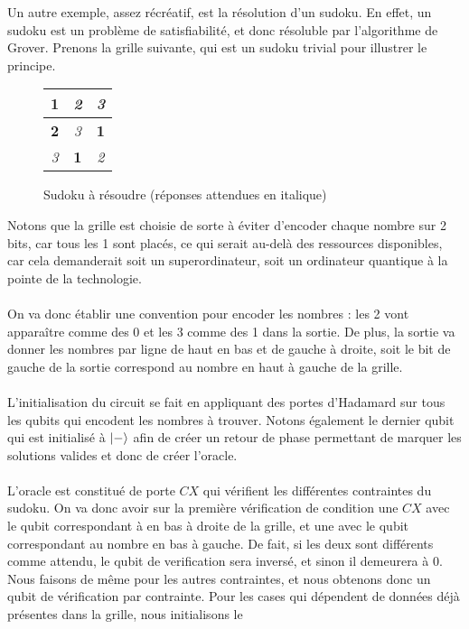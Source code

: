 Un autre exemple, assez récréatif, est la résolution d'un sudoku.
En effet, un sudoku est un problème de satisfiabilité, et donc résoluble par l'algorithme
de Grover.
Prenons la grille suivante, qui est un sudoku trivial pour illustrer le principe.
\begin{figure}[H]
    \centering
    \begin{tabular}{|c|c|c|}
        \hline
        \textbf{1} & \textit{2} & \textit{3} \\
        \hline
        \textbf{2} & \textit{3} & \textbf{1} \\
        \hline
        \textit{3} & \textbf{1} & \textit{2} \\
        \hline
    \end{tabular}
    \caption{Sudoku à résoudre (réponses attendues en italique)}
    \label{fig:sudoku}
\end{figure}
Notons que la grille est choisie de sorte à éviter d'encoder chaque nombre sur 2 bits,
car tous les 1 sont placés, ce qui serait au-delà des ressources disponibles, car cela
demanderait soit un superordinateur, soit un ordinateur quantique à la pointe de la technologie.\\ \\
On va donc établir une convention pour encoder les nombres : les 2 vont apparaître comme des
0 et les 3 comme des 1 dans la sortie.
De plus, la sortie va donner les nombres par ligne de haut en bas et de gauche à droite, soit
le bit de gauche de la sortie correspond au nombre en haut à gauche de la grille.\\ \\
L'initialisation du circuit se fait en appliquant des portes d'Hadamard sur tous les qubits
qui encodent les nombres à trouver.
Notons également le dernier qubit qui est initialisé à $\ket{-}$ afin de créer un retour
de phase permettant de marquer les solutions valides et donc de créer l'oracle.\\ \\
L'oracle est constitué de porte $CX$ qui vérifient les différentes contraintes du sudoku.
On va donc avoir sur la première vérification de condition une $CX$ avec le qubit correspondant
à en bas à droite de la grille, et une avec le qubit correspondant au nombre en bas à gauche.
De fait, si les deux sont différents comme attendu, le qubit de verification sera inversé, et
sinon il demeurera à 0.
Nous faisons de même pour les autres contraintes, et nous obtenons donc un qubit de vérification
par contrainte.
Pour les cases qui dépendent de données déjà présentes dans la grille, nous initialisons le
